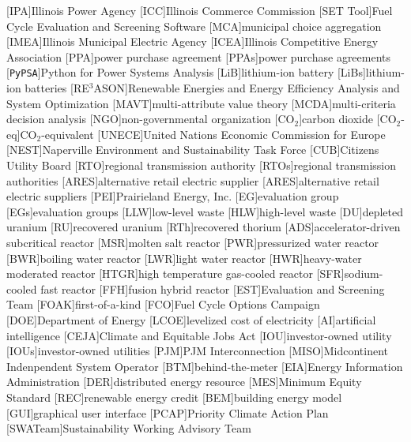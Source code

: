 [IPA]{Illinois Power Agency}
[ICC]{Illinois Commerce Commission}
[SET Tool]{Fuel Cycle Evaluation and Screening Software}
[MCA]{municipal choice aggregation}
[IMEA]{Illinois Municipal Electric Agency}
[ICEA]{Illinois Competitive Energy Association}
[PPA]{power purchase agreement}
[PPAs]{power purchase agreements}
[\texttt{PyPSA}]{Python for Power Systems Analysis}
[LiB]{lithium-ion battery}
[LiBs]{lithium-ion batteries}
[RE$^3$ASON]{Renewable Energies and Energy Efficiency Analysis and System Optimization}
[MAVT]{multi-attribute value theory}
[MCDA]{multi-criteria decision analysis}
[NGO]{non-governmental organization}
[CO$_2$]{carbon dioxide}
[CO$_2$-eq]{CO$_2$-equivalent}
[UNECE]{United Nations Economic Commission for Europe}
[NEST]{Naperville Environment and Sustainability Task Force}
[CUB]{Citizens Utility Board}
[RTO]{regional transmission authority}
[RTOs]{regional transmission authorities}
[ARES]{alternative retail electric supplier}
[ARES]{alternative retail electric suppliers}
[PEI]{Prairieland Energy, Inc.}
[EG]{evaluation group}
[EGs]{evaluation groups}
[LLW]{low-level waste}
[HLW]{high-level waste}
[DU]{depleted uranium}
[RU]{recovered uranium}
[RTh]{recovered thorium}
[ADS]{accelerator-driven subcritical reactor}
[MSR]{molten salt reactor}
[PWR]{pressurized water reactor}
[BWR]{boiling water reactor}
[LWR]{light water reactor}
[HWR]{heavy-water moderated reactor}
[HTGR]{high temperature gas-cooled reactor}
[SFR]{sodium-cooled fast reactor}
[FFH]{fusion hybrid reactor}
[EST]{Evaluation and Screening Team}
[FOAK]{first-of-a-kind}
[FCO]{Fuel Cycle Options Campaign}
[DOE]{Department of Energy}
[LCOE]{levelized cost of electricity}
[AI]{artificial intelligence}
[CEJA]{Climate and Equitable Jobs Act}
[IOU]{investor-owned utility}
[IOUs]{investor-owned utilities}
[PJM]{PJM Interconnection}
[MISO]{Midcontinent Indenpendent System Operator}
[BTM]{behind-the-meter}
[EIA]{Energy Information Administration}
[DER]{distributed energy resource}
[MES]{Minimum Equity Standard}
[REC]{renewable energy credit}
[BEM]{building energy model}
[GUI]{graphical user interface}
[PCAP]{Priority Climate Action Plan}
[SWATeam]{Sustainability Working Advisory Team}


